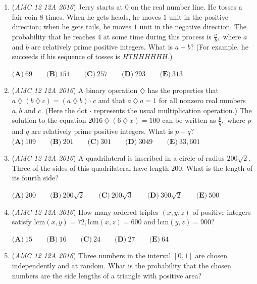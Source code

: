\begin{enumerate}
 $\textbf{(A)}\ 110\qquad\textbf{(B)}\ 191\qquad\textbf{(C)}\ 261\qquad\textbf{(D)}\ 325\qquad\textbf{(E)}\ 425$


	\item (\textit{AMC 12 12A 2016}) Jerry starts at $0$ on the real number line. He tosses a fair coin $8$ times. When he gets heads, he moves $1$ unit in the positive direction; when he gets tails, he moves $1$ unit in the negative direction. The probability that he reaches $4$ at some time during this process is $\frac{a}{b},$ where $a$ and $b$ are relatively prime positive integers. What is $a + b?$ (For example, he succeeds if his sequence of tosses is $HTHHHHHH.$)


 $\textbf{(A)}\ 69\qquad\textbf{(B)}\ 151\qquad\textbf{(C)}\ 257\qquad\textbf{(D)}\ 293\qquad\textbf{(E)}\ 313$


	\item (\textit{AMC 12 12A 2016}) A binary operation $\diamondsuit$ has the properties that $a\ \diamondsuit\ (b\ \diamondsuit\ c) = (a\ \diamondsuit\ b)\cdot c$ and that $a\ \diamondsuit\ a = 1$ for all nonzero real numbers $a, b$ and $c.$ (Here the dot  $\cdot$  represents the usual multiplication operation.) The solution to the equation $2016\ \diamondsuit\ (6\ \diamondsuit\ x) = 100$ can be written as $\frac{p}{q},$ where $p$ and $q$ are relatively prime positive integers. What is $p + q?$
$\textbf{(A)}\ 109\qquad\textbf{(B)}\ 201\qquad\textbf{(C)}\ 301\qquad\textbf{(D)}\ 3049\qquad\textbf{(E)}\ 33,601$


	\item (\textit{AMC 12 12A 2016}) A quadrilateral is inscribed in a circle of radius $200\sqrt{2}.$ Three of the sides of this quadrilateral have length $200.$ What is the length of its fourth side? 


 $\textbf{(A)}\ 200\qquad\textbf{(B)}\ 200\sqrt{2} \qquad\textbf{(C)}\ 200\sqrt{3} \qquad\textbf{(D)}\ 300\sqrt{2} \qquad\textbf{(E)}\ 500$


	\item (\textit{AMC 12 12A 2016}) How many ordered triples $(x,y,z)$ of positive integers satisfy $\text{lcm}(x,y) = 72, \text{lcm}(x,z) = 600$ and $\text{lcm}(y,z)=900$?


 $\textbf{(A)}\ 15\qquad\textbf{(B)}\ 16\qquad\textbf{(C)}\ 24\qquad\textbf{(D)}\ 27\qquad\textbf{(E)}\ 64$


	\item (\textit{AMC 12 12A 2016}) Three numbers in the interval $\left[0,1\right]$ are chosen independently and at random. What is the probability that the chosen numbers are the side lengths of a triangle with positive area?



\end{enumerate}
